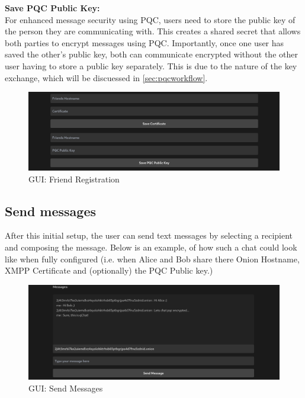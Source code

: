\textbf{Save PQC Public Key:}\\
For enhanced message security using PQC, users need to store the public key of the person they are communicating with. This creates a shared secret that allows both parties to encrypt messages using PQC. Importantly, once one user has saved the other's public key, both can communicate encrypted without the other user having to store a public key separately. This is due to the nature of the key exchange, which will be discuessed in \ref{sec:pqcworkflow}.

\begin{figure}[H]
    \centering
    \includegraphics[width=1\linewidth]{resources/client/RegistrationFriend.png}
    \caption{GUI: Friend Registration}
    \label{fig:friendReg}
\end{figure}

\subsection{Send messages}
After this initial setup, the user can send text messages by selecting a recipient and composing the message.
Below is an example, of how such a chat could look like when fully configured (i.e. when Alice and Bob share there Onion Hostname, XMPP Certificate and (optionally) the PQC Public key.)
\begin{figure}[H]
    \centering
    \includegraphics[width=1\linewidth]{resources/client/SendMessages.png}
    \caption{GUI: Send Messages}
    \label{fig:sendMessages}
\end{figure}
